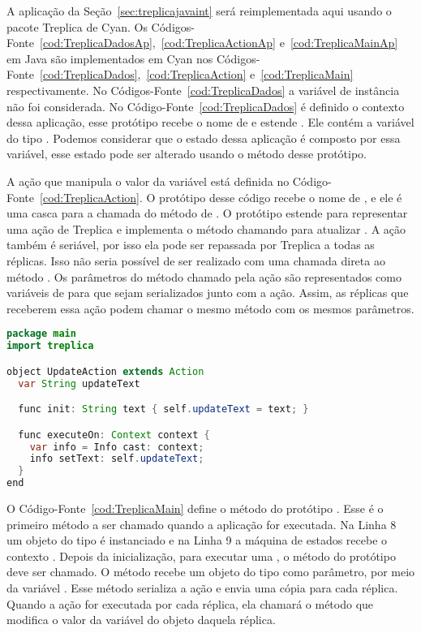 A aplicação da Seção~\ref{sec:treplicajavaint} será reimplementada aqui usando o pacote Treplica de Cyan. Os Códigos-Fonte~\ref{cod:TreplicaDadosAp},~\ref{cod:TreplicaActionAp} e~\ref{cod:TreplicaMainAp} em Java são implementados em Cyan nos Códigos-Fonte~\ref{cod:TreplicaDados},~\ref{cod:TreplicaAction} e~\ref{cod:TreplicaMain} respectivamente. No Códigos-Fonte~\ref{cod:TreplicaDados} a variável de instância  não foi considerada. No Código-Fonte~\ref{cod:TreplicaDados} é definido o contexto dessa aplicação, esse protótipo recebe o nome de  e estende . Ele contém a variável  do tipo . Podemos considerar que o estado dessa aplicação é composto por essa variável, esse estado pode ser alterado usando o método  desse protótipo.

A ação que manipula o valor da variável  está definida no Código-Fonte~\ref{cod:TreplicaAction}. O protótipo desse código recebe o nome de , e ele é uma casca para a chamada do método  de . O protótipo  estende  para representar uma ação de Treplica e implementa o método  chamando  para atualizar . A ação também é seriável, por isso ela pode ser repassada por Treplica a todas as réplicas. Isso não seria possível de ser realizado com uma chamada direta ao método . Os parâmetros do método chamado pela ação são representados como variáveis de  para que sejam serializados junto com a ação. Assim, as réplicas que receberem essa ação podem chamar o mesmo método com os mesmos parâmetros.

\begin{lstlisting}[language=Java, caption={Protótipo que implementa uma transição}, label={cod:TreplicaAction}]
package main
import treplica

object UpdateAction extends Action
  var String updateText

  func init: String text { self.updateText = text; }

  func executeOn: Context context {
    var info = Info cast: context;
    info setText: self.updateText;
  }
end
\end{lstlisting}

O Código-Fonte~\ref{cod:TreplicaMain} define o método  do protótipo . Esse é o primeiro método a ser chamado quando a aplicação for executada. Na Linha 8 um objeto do tipo  é instanciado e na Linha 9 a máquina de estados recebe o contexto . Depois da inicialização, para executar uma , o método  do protótipo  deve ser chamado. O método  recebe um objeto do tipo  como parâmetro, por meio da variável . Esse método serializa a ação e envia uma cópia para cada réplica. Quando a ação for executada por cada réplica, ela chamará o método  que modifica o valor da variável  do objeto  daquela réplica. 

